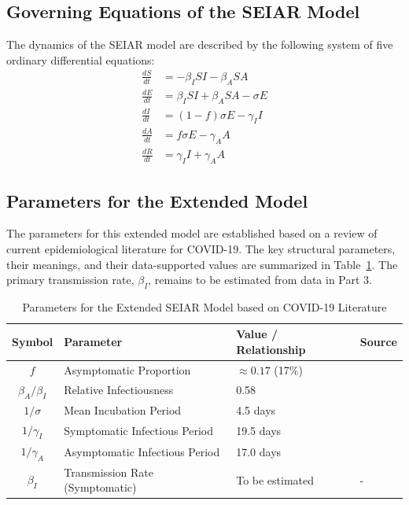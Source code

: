 \documentclass[12pt, a4paper]{article}
\begin{document}
\subsection{Governing Equations of the SEIAR Model}
The dynamics of the SEIAR model are described by the following system of five ordinary differential equations:
\begin{align}
\frac{dS}{dt} &= -\beta_I SI - \beta_A SA \\
\frac{dE}{dt} &= \beta_I SI + \beta_A SA - \sigma E \\
\frac{dI}{dt} &= (1-f)\sigma E - \gamma_I I \\
\frac{dA}{dt} &= f\sigma E - \gamma_A A \\
\frac{dR}{dt} &= \gamma_I I + \gamma_A A
\end{align}

\subsection{Parameters for the Extended Model}
The parameters for this extended model are established based on a review of current epidemiological literature for COVID-19. The key structural parameters, their meanings, and their data-supported values are summarized in Table~\ref{tab:params}. The primary transmission rate, $\beta_I$, remains to be estimated from data in Part 3.

\begin{table}[h!]
\centering
\caption{Parameters for the Extended SEIAR Model based on COVID-19 Literature}
\begin{tabular}{|c|l|l|l|}
\hline
\textbf{Symbol} & \textbf{Parameter} & \textbf{Value / Relationship} & \textbf{Source} \\
\hline
$f$ & Asymptomatic Proportion & $\approx 0.17$ (17\%) & \cite{Byambasuren2020} \\
$\beta_A / \beta_I$ & Relative Infectiousness & 0.58 & \cite{Byambasuren2020} \\
$1/\sigma$ & Mean Incubation Period & 4.5 days & \cite{Wong2020} \\
$1/\gamma_I$ & Symptomatic Infectious Period & 19.5 days & \cite{Wang2022} \\
$1/\gamma_A$ & Asymptomatic Infectious Period & 17.0 days & \cite{Wang2022} \\
\hline
$\beta_I$ & Transmission Rate (Symptomatic) & To be estimated & - \\
\hline
\end{tabular}
\label{tab:params}
\end{table}
\end{document}
